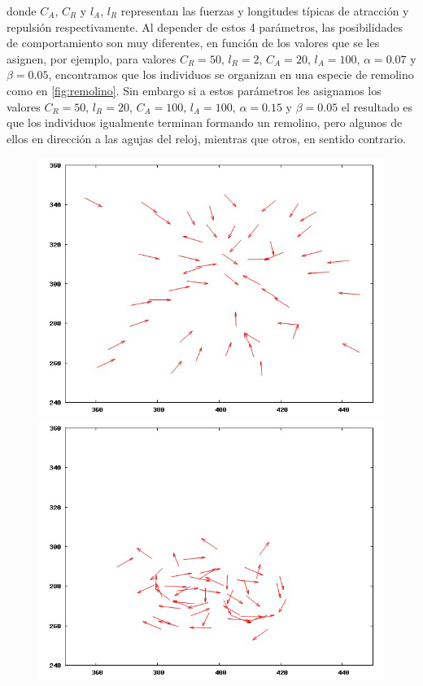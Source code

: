 donde $C_A$, $C_R$ y $l_A$, $l_R$ representan las fuerzas y longitudes típicas de atracción y repulsión respectivamente. Al depender de estos 4 parámetros, las posibilidades de comportamiento son muy diferentes, en función de los valores que se les asignen, por ejemplo, para valores $C_R = 50$, $l_R = 2$, $C_A = 20$, $l_A = 100$, $\alpha = 0.07$ y $\beta = 0.05$, encontramos que los individuos se organizan en una especie de remolino como en \ref{fig:remolino}. Sin embargo si a estos parámetros les asignamos los valores $C_R = 50$, $l_R = 20$, $C_A = 100$, $l_A = 100$, $\alpha = 0.15$ y $\beta = 0.05$ el resultado es que los individuos igualmente terminan formando un remolino, pero algunos de ellos en dirección a las agujas del reloj, mientras que otros, en sentido contrario. 

\begin{figure}[!ht]
\centering
    \includegraphics[scale=0.3]{fig/cap02/atraccionRepulsion/11.png}
    \includegraphics[scale=0.3]{fig/cap02/atraccionRepulsion/12.png}

\end{figure}
